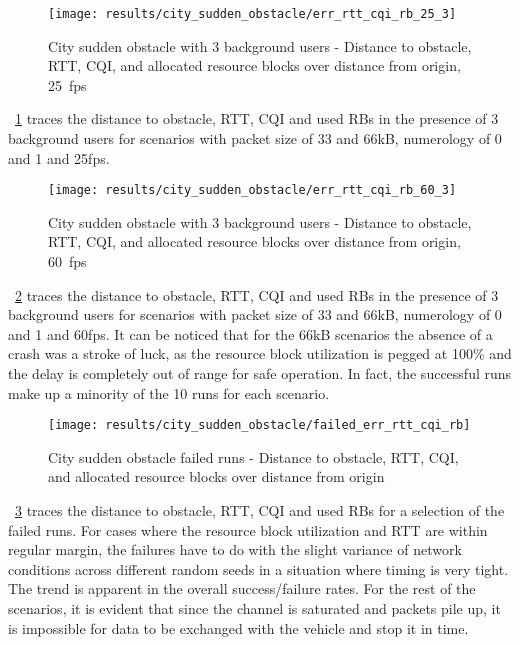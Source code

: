 \begin{figure}[H]
    \centering
    \texttt{[image: results/city\_sudden\_obstacle/err\_rtt\_cqi\_rb\_25\_3]}
    \caption{City sudden obstacle with 3 background users - Distance to obstacle, RTT, CQI, and allocated resource blocks over distance from origin, 25~fps}
    \label{fig:city_sudden_obstacle_err_rtt_cqi_rb_25_3}
\end{figure}

\figurename~\ref{fig:city_sudden_obstacle_err_rtt_cqi_rb_25_3} traces the distance to obstacle, RTT, CQI and used RBs in the presence of 3 background users for scenarios with packet size of 33 and 66kB, numerology of 0 and 1 and 25fps.

\begin{figure}[H]
    \centering
    \texttt{[image: results/city\_sudden\_obstacle/err\_rtt\_cqi\_rb\_60\_3]}
    \caption{City sudden obstacle with 3 background users - Distance to obstacle, RTT, CQI, and allocated resource blocks over distance from origin, 60~fps}
    \label{fig:city_sudden_obstacle_err_rtt_cqi_rb_60_3}
\end{figure}

\figurename~\ref{fig:city_sudden_obstacle_err_rtt_cqi_rb_60_3} traces the distance to obstacle, RTT, CQI and used RBs in the presence of 3 background users for scenarios with packet size of 33 and 66kB, numerology of 0 and 1 and 60fps. It can be noticed that for the 66kB scenarios the absence of a crash was a stroke of luck, as the resource block utilization is pegged at 100\% and the delay is completely out of range for safe operation. In fact, the successful runs make up a minority of the 10 runs for each scenario.

\begin{figure}[H]
    \centering
    \texttt{[image: results/city\_sudden\_obstacle/failed\_err\_rtt\_cqi\_rb]}
    \caption{City sudden obstacle failed runs - Distance to obstacle, RTT, CQI, and allocated resource blocks over distance from origin}
    \label{fig:city_sudden_obstacle_failed_err_rtt_cqi_rb_60_3}
\end{figure}

\figurename~\ref{fig:city_sudden_obstacle_failed_err_rtt_cqi_rb_60_3} traces the distance to obstacle, RTT, CQI and used RBs for a selection of the failed runs. For cases where the resource block utilization and RTT are within regular margin, the failures have to do with the slight variance of network conditions across different random seeds in a situation where timing is very tight. The trend is apparent in the overall success/failure rates. For the rest of the scenarios, it is evident that since the channel is saturated and packets pile up, it is impossible for data to be exchanged with the vehicle and stop it in time.


